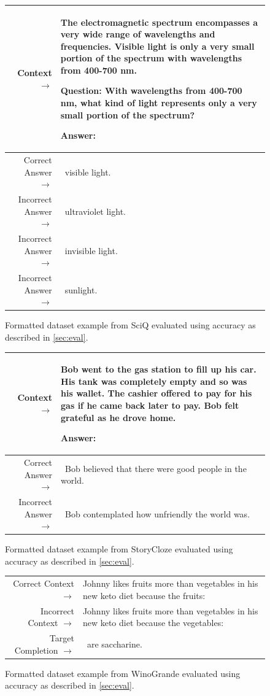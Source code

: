 \documentclass{article}
\begin{document}
\begin{figure}[!h] { \tt \footnotesize \begin{tabularx}{\linewidth}{r X} \toprule Context $\to$ & The electromagnetic spectrum encompasses a very wide range of wavelengths and frequencies. Visible light is only a very small portion of the spectrum with wavelengths from 400-700 nm.

Question: With wavelengths from 400-700 nm, what kind of light represents only a very small portion of the spectrum?

Answer:\\
\midrule 
Correct Answer $\to$ & ~visible light.\\
Incorrect Answer $\to$ & ~ultraviolet light. \\ 
Incorrect Answer $\to$ & ~invisible light. \\
Incorrect Answer $\to$ & ~sunlight. \\
\bottomrule \end{tabularx} }
\caption{Formatted dataset example from SciQ evaluated using accuracy as described in \autoref{sec:eval}.}  
\label{eval:sciq}  
\end{figure}


\begin{figure}[!h] { \tt \footnotesize \begin{tabularx}{\linewidth}{r X} \toprule Context $\to$ & Bob went to the gas station to fill up his car. His tank was completely empty and so was his wallet. The cashier offered to pay for his gas if he came back later to pay. Bob felt grateful as he drove home.

Answer:\\
\midrule 
Correct Answer $\to$ & ~Bob believed that there were good people in the world.\\
Incorrect Answer $\to$ & ~Bob contemplated how unfriendly the world was.\\
\bottomrule \end{tabularx} }
\caption{Formatted dataset example from StoryCloze evaluated using accuracy as described in \autoref{sec:eval}.}
\label{eval:storycloze}  
\end{figure}

\begin{figure}[!h] { \tt \footnotesize \begin{tabularx}{\linewidth}{r X} \toprule Correct Context $\to$ & Johnny likes fruits more than vegetables in his new keto diet because the fruits:\\
Incorrect Context $\to$ & Johnny likes fruits more than vegetables in his new keto diet because the
vegetables:\\
\midrule 
Target Completion $\to$ & ~are saccharine.\\
\bottomrule \end{tabularx} }
\caption{Formatted dataset example from WinoGrande evaluated using accuracy as described in \autoref{sec:eval}.}  
\label{eval:winogrande}  
\end{figure}
\end{document}

